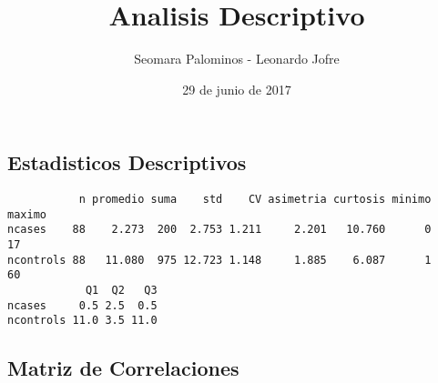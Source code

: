 \documentclass[]{article}
\title{Analisis Descriptivo}
\author{Seomara Palominos - Leonardo Jofre}
\date{29 de junio de 2017}
\begin{document}
\maketitle

\subsection{Estadisticos Descriptivos}\label{estadisticos-descriptivos}

\begin{verbatim}
           n promedio suma    std    CV asimetria curtosis minimo maximo
ncases    88    2.273  200  2.753 1.211     2.201   10.760      0     17
ncontrols 88   11.080  975 12.723 1.148     1.885    6.087      1     60
            Q1  Q2   Q3
ncases     0.5 2.5  0.5
ncontrols 11.0 3.5 11.0
\end{verbatim}

\subsection{Matriz de Correlaciones}\label{matriz-de-correlaciones}
\end{document}
